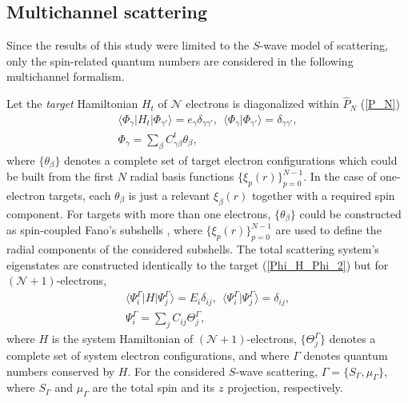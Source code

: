 \documentclass[aip
, pra
, showpacs
, aps
, twocolumn
, groupedaddress
, floatfix
]{revtex4}
\newcommand{\beq}{\begin{equation}}
\newcommand{\eeq}{\end{equation}}
\newcommand{\barr}{\begin{array}}
\newcommand{\earr}{\end{array}}
\begin{document}
\subsection{Multichannel scattering}
Since the results of this study were limited to the $S$-wave model of scattering,
only the spin-related quantum numbers are considered in the
following multichannel formalism.


Let the {\em target} Hamiltonian $H_t$ of
$\mathcal{N}$ electrons
is diagonalized within $\hat{P}_N$ (\ref{P_N})
\beq \barr{l}
\langle \Phi_\gamma|H_t|\Phi_{\gamma'}\rangle=e_\gamma \delta_{\gamma\gamma'}, \ \
\langle \Phi_\gamma|\Phi_{\gamma'}\rangle=\delta_{\gamma\gamma'},\\
\Phi_\gamma = \sum_{\beta} C^t_{\gamma \beta} \theta_\beta,
\earr \label{Phi_H_Phi_2} \eeq
where $\{\theta_\beta\}$ denotes a complete set of target electron configurations which could be built from
the first $N$ radial basis functions $\{\xi_p(r)\}_{p=0}^{N-1}$.
In the case of one-electron targets, each
$\theta_\beta$ is just a relevant $\xi_\beta(r)$ together with a required spin component.
For targets with more than one electrons, $\{\theta_\beta\}$ could be constructed as spin-coupled Fano's subshells \cite{Fano65,KFB11},
where $\{\xi_p(r)\}_{p=0}^{N-1}$ are used to define the radial components of the considered subshells.
The total scattering system's eigenstates are constructed identically to the target (\ref{Phi_H_Phi_2})
but for $(\mathcal{N}+1)$-electrons,
\beq \barr{l}
\langle\Psi_i^\Gamma|H|\Psi_j^\Gamma\rangle=E_i\delta_{ij}, \ \
 \langle\Psi_i^\Gamma|\Psi_j^\Gamma\rangle=\delta_{ij},\\
\Psi^\Gamma_i = \sum_{j} C_{ij} \Theta^\Gamma_j,
\earr \label{Psi_H_Psi_2} \eeq
where $H$ is the system Hamiltonian of $(\mathcal{N}+1)$-electrons, $\{\Theta_j^\Gamma\}$
denotes a complete set of system electron configurations, and where
$\Gamma$ denotes quantum numbers conserved by $H$.
For the considered $S$-wave scattering,
$\Gamma=\{S_\Gamma,\mu_\Gamma\}$, where $S_\Gamma$ and $\mu_\Gamma$ are the total spin and its $z$ projection, respectively.
\end{document}
